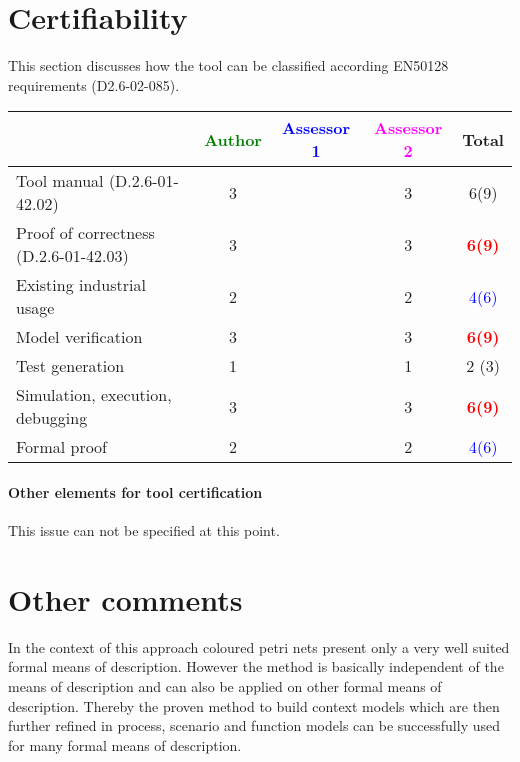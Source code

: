 \section{Certifiability}

This section discusses how the tool can be classified according EN50128 requirements (D2.6-02-085).


\begin{tabular}{|l | c | c | c | c|}
\hline
& \textcolor{green}{Author} & \textcolor{blue}{Assessor 1} & \textcolor{magenta}{Assessor 2} & Total \\
\hline 
Tool manual (D.2.6-01-42.02) & 3     & & 3     &  6(9) \\
\hline
Proof of correctness (D.2.6-01-42.03)   & 3      & & 3     & \textcolor{red}{\textbf{6(9)}}  \\
\hline
Existing industrial  usage  & 2     & & 2     & \textcolor{blue}{4(6)}  \\
\hline
Model verification & 3     & & 3     & \textcolor{red}{\textbf{6(9)}}  \\
\hline
Test generation & 1     & & 1     & 2 (3) \\
\hline
Simulation, execution, debugging & 3     & & 3     & \textcolor{red}{\textbf{6(9)}}  \\
\hline
Formal proof & 2     & & 2     & \textcolor{blue}{4(6)}  \\
\hline
\end{tabular}


\paragraph{Other elements for tool certification}
This issue can not be specified at this point.


\section{Other comments}
In the context of this approach coloured petri nets present only a very well suited formal means of description. However the method is basically independent of the means of description and can also be applied on other formal means of description. Thereby the proven method to build context models which are then further refined in process, scenario and function models can be successfully used for many formal means of description. 



